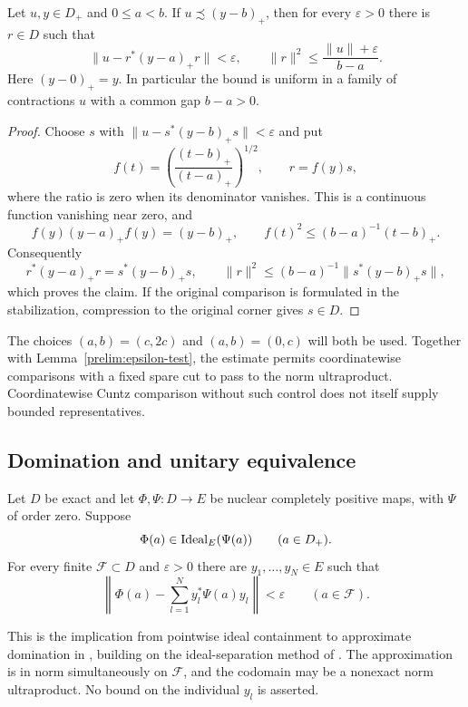 \begin{lemma}
\label{prelim:bounded-witness}
Let $u,y\in D_+$ and $0\le a<b$.  If
$u\precsim(y-b)_+$, then for every $\varepsilon>0$ there is $r\in D$
such that
\[
 \|u-r^*(y-a)_+r\|<\varepsilon,
 \qquad
 \|r\|^2\le\frac{\|u\|+\varepsilon}{b-a}.
\]
Here $(y-0)_+=y$.  In particular the bound is uniform in a family of
contractions $u$ with a common gap $b-a>0$.
\end{lemma}

\begin{proof}
Choose $s$ with $\|u-s^*(y-b)_+s\|<\varepsilon$ and put
\[
 f(t)=\left(\frac{(t-b)_+}{(t-a)_+}\right)^{1/2},
 \qquad r=f(y)s,
\]
where the ratio is zero when its denominator vanishes.  This is a
continuous function vanishing near zero, and
\[
 f(y)(y-a)_+f(y)=(y-b)_+,
 \qquad f(t)^2\le(b-a)^{-1}(t-b)_+.
\]
Consequently
\[
 r^*(y-a)_+r=s^*(y-b)_+s,
 \qquad
 \|r\|^2\le(b-a)^{-1}\|s^*(y-b)_+s\|,
\]
which proves the claim.  If the original comparison is formulated in
the stabilization, compression to the original corner gives $s\in D$.
\end{proof}

The choices $(a,b)=(c,2c)$ and $(a,b)=(0,c)$ will both be used.
Together with Lemma~\ref{prelim:epsilon-test}, the estimate permits
coordinatewise comparisons with a fixed spare cut to pass to the norm
ultraproduct.  Coordinatewise Cuntz comparison without such control
does not itself supply bounded representatives.

\subsection{Domination and unitary equivalence}

\begin{theorem}
\label{prelim:domination}
Let $D$ be exact and let $\Phi,\Psi:D\to E$ be nuclear completely
positive maps, with $\Psi$ of order zero.  Suppose
\[
 \Phi(a)\in\operatorname{Ideal}_E(\Psi(a))\qquad(a\in D_+).
\]
For every finite $\mathcal F\subset D$ and $\varepsilon>0$ there are
$y_1,\ldots,y_N\in E$ such that
\[
 \left\|\Phi(a)-\sum_{l=1}^Ny_l^*\Psi(a)y_l\right\|<\varepsilon
 \qquad(a\in\mathcal F).
\]
\end{theorem}

This is the implication from pointwise ideal containment to approximate
domination in \cite[Theorem~3.3]{Gabe}, building on the ideal-separation
method of \cite[Proposition~4.2]{KR05}.  The approximation is in norm
simultaneously on $\mathcal F$, and the codomain may be a nonexact norm
ultraproduct.  No bound on the individual $y_l$ is asserted.

